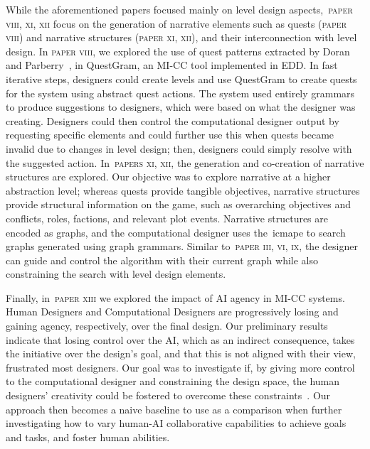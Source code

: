 While the aforementioned papers focused mainly on level design aspects,~\textsc{paper viii, xi, xii} focus on the generation of narrative elements such as quests (\textsc{paper viii}) and narrative structures (\textsc{paper xi, xii}), and their interconnection with level design. In \textsc{paper viii}, we explored the use of quest patterns extracted by Doran and Parberry~\cite{doran_prototype_2011}, in QuestGram, an MI-CC tool implemented in EDD. In fast iterative steps, designers could create levels and use QuestGram to create quests for the system using abstract quest actions. The system used entirely grammars to produce suggestions to designers, which were based on what the designer was creating. Designers could then control the computational designer output by requesting specific elements and could further use this when quests became invalid due to changes in level design; then, designers could simply resolve with the suggested action. In~\textsc{papers xi, xii}, the generation and co-creation of narrative structures are explored. Our objective was to explore narrative at a higher abstraction level; whereas quests provide tangible objectives, narrative structures provide structural information on the game, such as overarching objectives and conflicts, roles, factions, and relevant plot events. Narrative structures are encoded as graphs, and the computational designer uses the~\acrshort{icmape} to search graphs generated using graph grammars. Similar to~\textsc{paper iii, vi, ix}, the designer can guide and control the algorithm with their current graph while also constraining the search with level design elements.

Finally, in~\textsc{paper xiii} we explored the impact of AI agency in MI-CC systems. Human Designers and Computational Designers are progressively losing and gaining agency, respectively, over the final design. Our preliminary results indicate that losing control over the AI, which as an indirect consequence, takes the initiative over the design's goal, and that this is not aligned with their view, frustrated most designers. Our goal was to investigate if, by giving more control to the computational designer and constraining the design space, the human designers' creativity could be fostered to overcome these constraints~\cite{bhaumik_lode_2021,acar_creativity_2019,boden_creative_2004}. Our approach then becomes a naive baseline to use as a comparison when further investigating how to vary human-AI collaborative capabilities to achieve goals and tasks, and foster human abilities.

